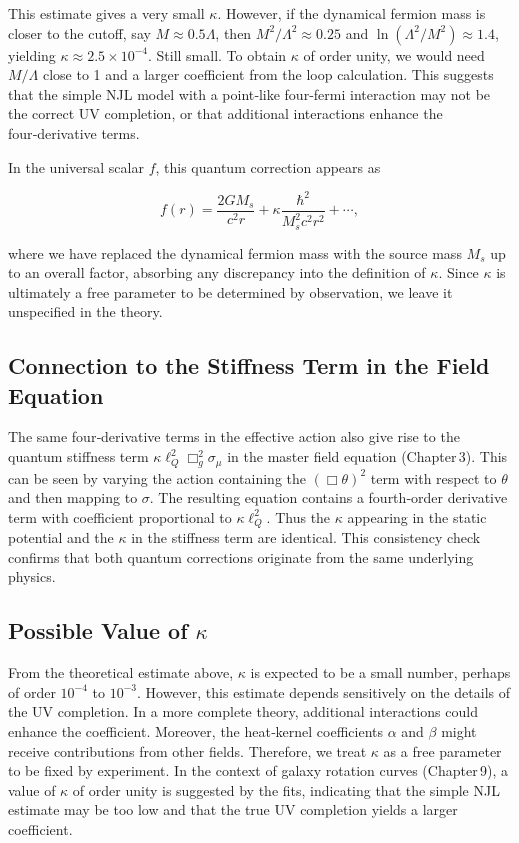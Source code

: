 \documentclass[11pt,a4paper]{article}
\begin{document}
This estimate gives a very small \(\kappa\). However, if the dynamical fermion mass is closer to the cutoff, say \(M \approx 0.5\Lambda\), then \(M^2/\Lambda^2 \approx 0.25\) and \(\ln(\Lambda^2/M^2) \approx 1.4\), yielding \(\kappa \approx 2.5 \times 10^{-4}\). Still small. To obtain \(\kappa\) of order unity, we would need \(M/\Lambda\) close to 1 and a larger coefficient from the loop calculation. This suggests that the simple NJL model with a point‑like four‑fermi interaction may not be the correct UV completion, or that additional interactions enhance the four‑derivative terms.

In the universal scalar \(f\), this quantum correction appears as

\begin{equation}
f(r) = \frac{2GM_s}{c^2 r} + \kappa \frac{\hbar^2}{M_s^2 c^2 r^2} + \cdots,
\end{equation}

where we have replaced the dynamical fermion mass with the source mass \(M_s\) up to an overall factor, absorbing any discrepancy into the definition of \(\kappa\). Since \(\kappa\) is ultimately a free parameter to be determined by observation, we leave it unspecified in the theory.

\subsection{Connection to the Stiffness Term in the Field Equation}

The same four‑derivative terms in the effective action also give rise to the quantum stiffness term \(\kappa \ell_Q^2 \Box_g^2 \sigma_\mu\) in the master field equation (Chapter 3). This can be seen by varying the action containing the \((\Box\theta)^2\) term with respect to \(\theta\) and then mapping to \(\sigma\). The resulting equation contains a fourth‑order derivative term with coefficient proportional to \(\kappa \ell_Q^2\). Thus the \(\kappa\) appearing in the static potential and the \(\kappa\) in the stiffness term are identical. This consistency check confirms that both quantum corrections originate from the same underlying physics.

\subsection{Possible Value of \(\kappa\)}

From the theoretical estimate above, \(\kappa\) is expected to be a small number, perhaps of order \(10^{-4}\) to \(10^{-3}\). However, this estimate depends sensitively on the details of the UV completion. In a more complete theory, additional interactions could enhance the coefficient. Moreover, the heat‑kernel coefficients \(\alpha\) and \(\beta\) might receive contributions from other fields. Therefore, we treat \(\kappa\) as a free parameter to be fixed by experiment. In the context of galaxy rotation curves (Chapter 9), a value of \(\kappa\) of order unity is suggested by the fits, indicating that the simple NJL estimate may be too low and that the true UV completion yields a larger coefficient.
\end{document}
